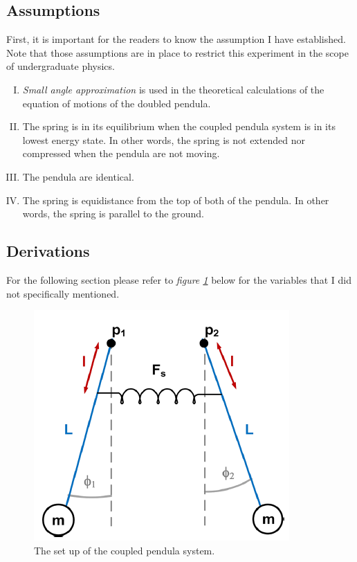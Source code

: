 \documentclass[aps,prl,reprint,10pt,amsmath,amssymb,superscriptaddress,a4paper]{revtex4-2}
\begin{document}
\subsection{Assumptions}
First, it is important for the readers to know the assumption I have established. Note that those assumptions are in place to restrict this experiment in the scope of undergraduate physics.
\begin{enumerate}[I.]
    \item \textit{Small angle approximation} is used in the theoretical calculations of the equation of motions of the doubled pendula. \label{Assumption 1}
    \item The spring is in its equilibrium when the coupled pendula system is in its lowest energy state. In other words, the spring is not extended nor compressed when the pendula are not moving. \label{Assumption 2}
    \item The pendula are identical. \label{Assumption 3}
    \item The spring is equidistance from the top of both of the pendula. In other words, the spring is parallel to the ground. \label{Assumption 4} 
\end{enumerate}

\subsection{Derivations}
For the following section please refer to \textit{figure \ref{fig 1}} below for the variables that I did not specifically mentioned.
\begin{figure}[H]
    \includegraphics[width = 8 cm]{images/coupledpendula set up.png}
    \caption{The set up of the coupled pendula system.\citep{lab_note} \label{fig 1}}
\end{figure}
\end{document}
